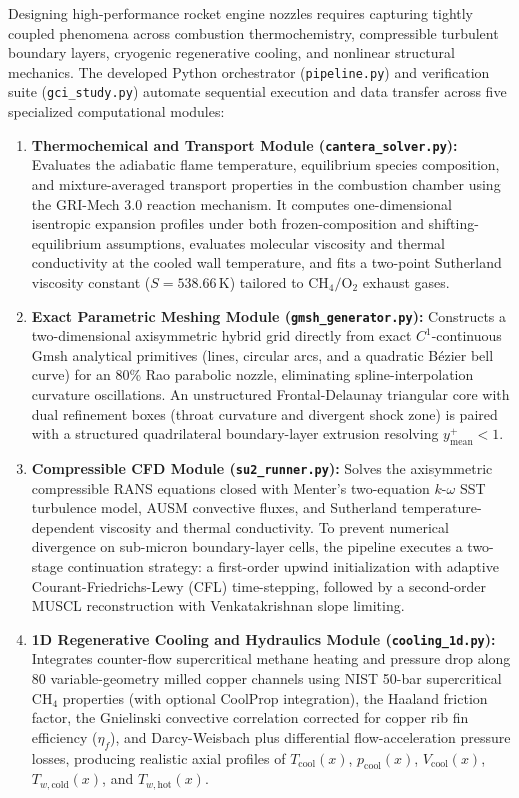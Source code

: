 \documentclass[11pt,a4paper]{article}
\begin{document}
Designing high-performance rocket engine nozzles requires capturing tightly coupled phenomena across combustion thermochemistry, compressible turbulent boundary layers, cryogenic regenerative cooling, and nonlinear structural mechanics. The developed Python orchestrator (\texttt{pipeline.py}) and verification suite (\texttt{gci\_study.py}) automate sequential execution and data transfer across five specialized computational modules:

\begin{enumerate}
    \item \textbf{Thermochemical and Transport Module (\texttt{cantera\_solver.py}):} Evaluates the adiabatic flame temperature, equilibrium species composition, and mixture-averaged transport properties in the combustion chamber using the GRI-Mech 3.0 reaction mechanism. It computes one-dimensional isentropic expansion profiles under both frozen-composition and shifting-equilibrium assumptions, evaluates molecular viscosity and thermal conductivity at the cooled wall temperature, and fits a two-point Sutherland viscosity constant ($S = 538.66\,\mathrm{K}$) tailored to $\mathrm{CH_4/O_2}$ exhaust gases.
    \item \textbf{Exact Parametric Meshing Module (\texttt{gmsh\_generator.py}):} Constructs a two-dimensional axisymmetric hybrid grid directly from exact $C^1$-continuous Gmsh analytical primitives (lines, circular arcs, and a quadratic B\'ezier bell curve) for an 80\% Rao parabolic nozzle, eliminating spline-interpolation curvature oscillations. An unstructured Frontal-Delaunay triangular core with dual refinement boxes (throat curvature and divergent shock zone) is paired with a structured quadrilateral boundary-layer extrusion resolving $y^+_{\mathrm{mean}} < 1$.
    \item \textbf{Compressible CFD Module (\texttt{su2\_runner.py}):} Solves the axisymmetric compressible RANS equations closed with Menter's two-equation $k$-$\omega$ SST turbulence model, AUSM convective fluxes, and Sutherland temperature-dependent viscosity and thermal conductivity. To prevent numerical divergence on sub-micron boundary-layer cells, the pipeline executes a two-stage continuation strategy: a first-order upwind initialization with adaptive Courant-Friedrichs-Lewy (CFL) time-stepping, followed by a second-order MUSCL reconstruction with Venkatakrishnan slope limiting.
    \item \textbf{1D Regenerative Cooling and Hydraulics Module (\texttt{cooling\_1d.py}):} Integrates counter-flow supercritical methane heating and pressure drop along $80$ variable-geometry milled copper channels using NIST 50-bar supercritical $\mathrm{CH_4}$ properties (with optional CoolProp integration), the Haaland friction factor, the Gnielinski convective correlation corrected for copper rib fin efficiency ($\eta_f$), and Darcy-Weisbach plus differential flow-acceleration pressure losses, producing realistic axial profiles of $T_{\mathrm{cool}}(x)$, $p_{\mathrm{cool}}(x)$, $V_{\mathrm{cool}}(x)$, $T_{w,\mathrm{cold}}(x)$, and $T_{w,\mathrm{hot}}(x)$.

\end{enumerate}
\end{document}
